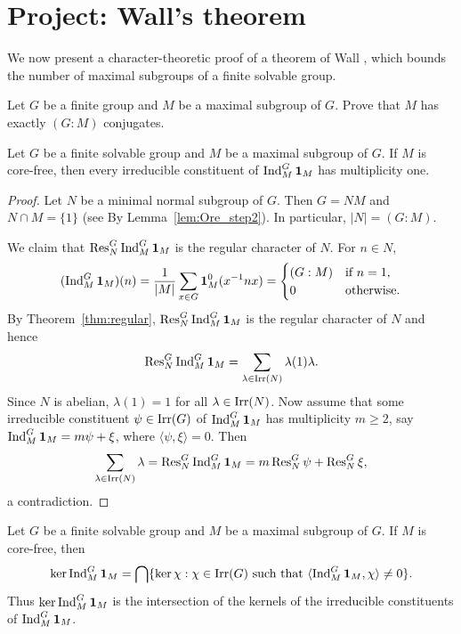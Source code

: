 \section{Project: Wall's theorem}

We now present a character-theoretic proof of a theorem of Wall \cite{MR125156}, 
which bounds the number of maximal subgroups of a finite solvable group. 

\begin{exercise}
    \label{xca:number_maximals}
    Let $G$ be a finite group and $M$ be a maximal subgroup of $G$.
    Prove that $M$ has exactly $(G:M)$ conjugates. 
\end{exercise}

\begin{lemma}
\label{lem:multiplicity-free}
    Let $G$ be a finite solvable group and $M$ be a maximal subgroup of $G$. If $M$ is core-free, then 
    every irreducible constituent of $\operatorname{Ind}_M^G\mathbf{1}_M$ has multiplicity one. 
\end{lemma}

\begin{proof}
    Let $N$ be a minimal normal subgroup of $G$. Then 
    $G=NM$ and $N\cap M=\{1\}$ (see 
    By Lemma~\ref{lem:Ore_step2}). In particular, 
    $|N|=(G:M)$. 

    We claim that 
    $\operatorname{Res}_N^G\operatorname{Ind}_M^G\mathbf{1}_M$ is the regular character of $N$. For 
    $n\in N$, 
    \[
    (\operatorname{Ind}_M^G\mathbf{1}_M)(n)=\frac{1}{|M|}\sum_{x\in G}\mathbf{1}_M^0(x^{-1}nx)
    =\begin{cases}
        (G:M) & \text{if $n=1$,}\\
        0 & \text{otherwise.}
    \end{cases}
    \]
    By Theorem~\ref{thm:regular}, 
    $\operatorname{Res}_N^G\operatorname{Ind}_M^G\mathbf{1}_M$ is the regular character of $N$ and hence 
    \[
    \operatorname{Res}_N^G\operatorname{Ind}_M^G\mathbf{1}_M=\sum_{\lambda\in\operatorname{Irr}(N)}\lambda(1)\lambda.
    \]
    Since $N$ is abelian, $\lambda(1)=1$ for all $\lambda\in\operatorname{Irr}(N)$. Now assume
    that some irreducible constituent $\psi\in\operatorname{Irr}(G)$ of $\operatorname{Ind}_M^G\mathbf{1}_M$ has
    multiplicity $m\geq2$, say $\operatorname{Ind}_M^G\mathbf{1}_M=m\psi+\xi$, where $\langle\psi,\xi\rangle=0$. 
    Then 
    \[
    \sum_{\lambda\in\operatorname{Irr}(N)}\lambda=\operatorname{Res}_N^G\operatorname{Ind}_M^G\mathbf{1}_M=m\operatorname{Res}_N^G\psi+\operatorname{Res}_N^G\xi,
    \]
    a contradiction. 
\end{proof}

\begin{lemma}
\label{lem:kernel}
    Let $G$ be a finite solvable group and $M$ be a maximal subgroup of $G$. If $M$ is core-free, then 
    \[
    \ker\operatorname{Ind}_M^G\mathbf{1}_M=\bigcap\{\ker\chi:\chi\in\operatorname{Irr}(G)\text{ such that }\langle\operatorname{Ind}_M^G\mathbf{1}_M,\chi\rangle\ne0\}.
    \]
    Thus $\ker\operatorname{Ind}_M^G\mathbf{1}_M$ is the intersection of the kernels of the irreducible constituents 
    of $\operatorname{Ind}_M^G\mathbf{1}_M$.
\end{lemma}

